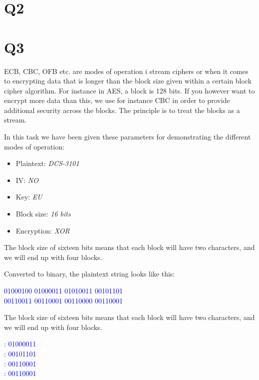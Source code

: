 \documentclass{article}
\begin{document}
\newpage
\section{Q2}
\newpage
\section{Q3}

ECB, CBC, OFB etc. are modes of operation i stream ciphers or when it comes to encrypting data that is longer than the block size given within a certain block cipher algorithm. For instance in AES, a block is 128 bits. If you however want to encrypt more data than this, we use for instance CBC in order to provide additional security across the blocks. The principle is to treat the blocks as a stream.

In this task we have been given these parameters for demonstrating the different modes of operation:
\begin{itemize}
\item{Plaintext: \textit{DCS-3101}}
\item{IV: \textit{NO}}
\item{Key: \textit{EU}}
\item{Block size: \textit{16 bits}}
\item{Encryption: \textit{XOR}}
\end{itemize}

The block size of sixteen bits means that each block will have two characters, and we will end up with four blocks.

Converted to binary, the plaintext string looks like this: 
\begin{tcolorbox}
\begin{center}
\textcolor{blue}{01000100 01000011 01010011 00101101 \\00110011 00110001 00110000 00110001}
\end{center}
\end{tcolorbox}

The block size of sixteen bits means that each block will have two characters, and we will end up with four blocks.

\begin{tcolorbox}
\begin{center}
\textcolor{blue}{
: 01000011\\
: 00101101\\
: 00110001\\
: 00110001}
\end{center}
\end{tcolorbox}
\end{document}
